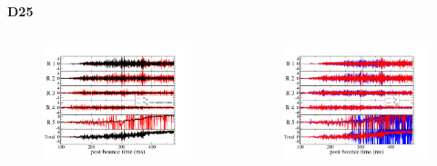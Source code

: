 \documentclass[aspectratio=169]{beamer}
\begin{document}
\begin{frame}

  \centerline{\textbf{D25}}

  \begin{columns}[c]

    \begin{figure}
      \includegraphics[width=1.0\textwidth]{Figures/D25_N2mvsN2mbar.pdf}
    \end{figure}

    \begin{figure}
      \includegraphics[width=1.0\textwidth]{Figures/D25_N2mvsI2m.pdf}
    \end{figure}

  \end{columns}

\end{frame}
\end{document}
